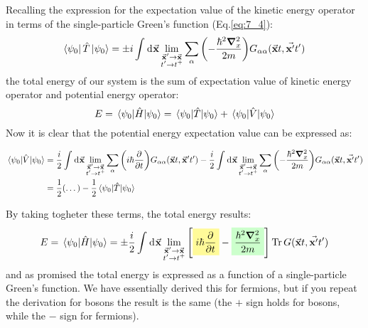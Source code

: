 \documentclass[../main/main.tex]{subfiles}
\begin{document}
Recalling the expression for the expectation value of the kinetic energy operator in terms of the single-particle Green's function (Eq.\eqref{eq:7_4}):
\begin{equation*}
  \bra{\psi _0} \hat{T} \ket{\psi _0} =
 \pm i \int_{}^{} \dd[]{\va{x}} \lim_{\substack{\va{x}'\rightarrow \va{x} \\ t' \rightarrow t^+} } \sum_{\alpha }^{}  \qty( - \frac{\hbar ^2 \grad ^2_x}{2m}) G_{\alpha \alpha } (\va{x}t,\va{x'}t')
\end{equation*}
the total energy of our system is the sum of expectation value of kinetic energy operator and potential energy operator:
\begin{equation*}
  E = \expval{\hat{H} }{\psi_0} = \expval{\hat{T} }{\psi_0} + \expval{\hat{V} }{\psi_0}
\end{equation*}
Now it is clear that the potential energy expectation value can be expressed as:
\begin{small}
  \begin{equation*}
  \begin{split}
    \expval{\hat{V} }{\psi_0}  &= \frac{i}{2}
    \int_{}^{} \dd[]{\va{x}}
    \lim_{\substack{\va{x}' \rightarrow \va{x} \\t' \rightarrow t^+ } }
    \sum_{\alpha }^{}
    \qty(i \hbar \pdv{}{t} )
    G_{\alpha \alpha }(\va{x}t,\va{x}'t')
    - \frac{i}{2}
    \int_{}^{} \dd[]{\va{x}} \lim_{\substack{\va{x}'\rightarrow \va{x} \\ t' \rightarrow t^+} } \sum_{\alpha }^{}  \qty( - \frac{\hbar ^2 \grad ^2_x}{2m}) G_{\alpha \alpha } (\va{x}t,\va{x'}t') \\
    &= \frac{1}{2} \qty(\dots) - \frac{1}{2}  \expval{\hat{T} }{\psi_0}
  \end{split}
  \end{equation*}
\end{small}
By taking togheter these terms, the total energy results: 
\begin{equation}
  E = \expval{\hat{H} }{\psi_0}
  = \pm \frac{i}{2}
  \int_{}^{} \dd[]{\va{x}} \lim_{\substack{\va{x}'\rightarrow \va{x} \\ t' \rightarrow t^+} }  \qty[ \mathcolorbox{yellow!40}{i \hbar \pdv{}{t}} - \mathcolorbox{green!20}{\frac{\hbar ^2 \grad ^2_x}{2m}}] \Tr G (\va{x}t,\va{x'}t')
  \label{eq:8_1}
\end{equation}
and as promised the total energy is expressed as a function of a single-particle Green's function. We have essentially derived this for fermions, but if you repeat the derivation for bosons the result is the same (the \(+\) sign holds for bosons, while the \(-\) sign for fermions).
\end{document}
